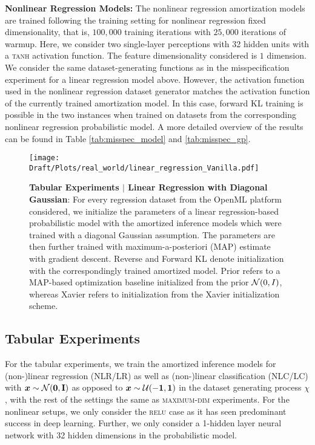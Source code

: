 \textbf{Nonlinear Regression Models:} The nonlinear regression amortization models are trained following the training setting for nonlinear regression fixed dimensionality, that is, $100,000$ training iterations with $25,000$ iterations of warmup. Here, we consider two single-layer perceptions with 32 hidden units with a \textsc{tanh} activation function. The feature dimensionality considered is $1$ dimension.
We consider the same dataset-generating functions as in the misspecification experiment for a linear regression model above. However, the activation function used in the nonlinear regression dataset generator matches the activation function of the currently trained amortization model. In this case, forward KL training is possible in the two instances when trained on datasets from the corresponding nonlinear regression probabilistic model. A more detailed overview of the results can be found in Table \ref{tab:misspec_model} and \ref{tab:misspec_gp}.

\begin{figure}
    \centering
    \texttt{[image: Draft/Plots/real\_world/linear\_regression\_Vanilla.pdf]}
    \caption{\textbf{Tabular Experiments $|$ Linear Regression with Diagonal Gaussian}: For every regression dataset from the OpenML platform considered, we initialize the parameters of a linear regression-based probabilistic model with the amortized inference models which were trained with a diagonal Gaussian assumption. The parameters are then further trained with maximum-a-posteriori (MAP) estimate with gradient descent. Reverse and Forward KL denote initialization with the correspondingly trained amortized model. Prior refers to a MAP-based optimization baseline initialized from the prior ${\mathcal{N}}(0, I)$, whereas Xavier refers to initialization from the Xavier initialization scheme.}
    \label{fig:regression_linear_vanilla}
\end{figure}

\subsection{Tabular Experiments}
\label{appdx:details_tabular}
For the tabular experiments, we train the amortized inference models for (non-)linear regression (NLR/LR) as well as (non-)linear classification (NLC/LC) with ${\bm{x}} \sim \mathcal{N}(\mathbf{0}, \mathbf{I})$ as opposed to ${\bm{x}} \sim {\mathcal{U}}(-\mathbf{1}, \mathbf{1})$ in the dataset generating process $\chi$, with the rest of the settings the same as \textsc{maximum-dim} experiments. For the nonlinear setups, we only consider the \textsc{relu} case as it has seen predominant success in deep learning. Further, we only consider a 1-hidden layer neural network with 32 hidden dimensions in the probabilistic model. 

